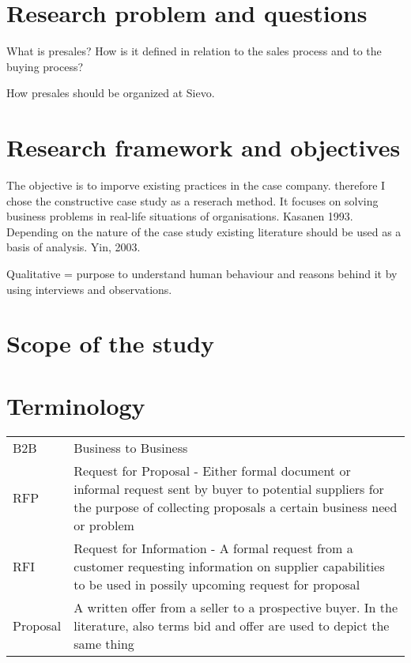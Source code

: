 \documentclass[12pt,a4paper,oneside,pdftex]{report}
\begin{document}
{{\section{Research problem and questions}
\label{section:constructive}

What is presales? How is it defined in relation to the sales process and to the buying process?

How presales should be organized at Sievo. 

\section{Research framework and objectives}
\label{section:structure}

The objective is to imporve existing practices in the case company. therefore I chose the constructive case study as a reserach method. It focuses on solving business problems in real-life situations of organisations. Kasanen 1993. Depending on the nature of the case study existing literature should be used as a basis of analysis. Yin, 2003. 

Qualitative = purpose to understand human behaviour and reasons behind it by using interviews and observations. 

\section{Scope of the study}
\label{section:structure}

\section{Terminology}
\label{section:Terminology}


\noindent
\begin{longtable}{@{}p{}p{}@{}}
B2B & Business to Business \\
RFP & Request for Proposal - Either formal document or informal request sent by buyer to potential suppliers for the purpose of collecting proposals a certain business need or problem \\
RFI & Request for Information - A formal request from a customer requesting information on supplier capabilities to be used in possily upcoming request for proposal \\
Proposal  & A written offer from a seller to a prospective buyer. In the literature, also terms bid and offer are used to depict the same thing \\


\end{longtable}}}
\end{document}
